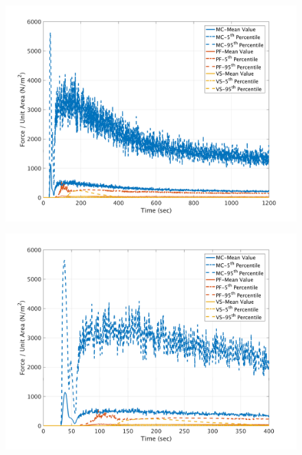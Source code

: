 \documentclass[a4paper,10pt]{article}
\begin{document}
\begin{figure}[H]
	\begin{minipage}[b]{0.5\linewidth}
	\centering
    \includegraphics[width=1\textwidth]{NetFAll/NetF8All.png}     
        \label{fig:NF8}
	\end{minipage}
	\begin{minipage}[b]{0.5\linewidth}
	\centering
    \includegraphics[width=1\textwidth]{NetFAll/NetF8All_z.png}
        \label{fig:NF8zoom}
	\end{minipage}
	

\end{figure}
\end{document}

